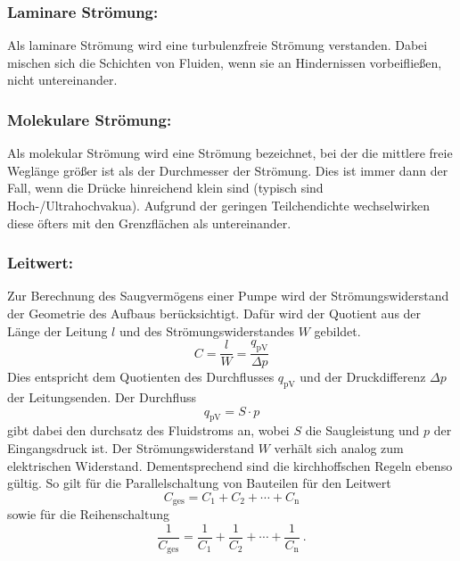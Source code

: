 \subsubsection{Laminare Strömung:}
Als laminare Strömung wird eine turbulenzfreie Strömung verstanden. Dabei mischen sich die Schichten von Fluiden, wenn sie an Hindernissen vorbeifließen, nicht untereinander.

\subsubsection{Molekulare Strömung:}
Als molekular Strömung wird eine Strömung bezeichnet, bei der die mittlere freie Weglänge größer ist als der Durchmesser der Strömung. Dies ist immer dann der Fall, wenn die Drücke hinreichend klein sind (typisch sind Hoch-/Ultrahochvakua). Aufgrund der geringen Teilchendichte wechselwirken diese öfters mit den Grenzflächen als untereinander.

\subsubsection{Leitwert:}
Zur Berechnung des Saugvermögens einer Pumpe wird der Strömungswiderstand der Geometrie des Aufbaus berücksichtigt. Dafür wird der Quotient aus der Länge der Leitung $l$ und des Strömungswiderstandes $W$ gebildet.
\begin{equation}
  C = \frac{l}{W} = \frac{q_\text{pV}}{\Delta p}
\end{equation}
Dies entspricht dem Quotienten des Durchflusses $q_\text{pV}$ und der Druckdifferenz $\Delta p$ der Leitungsenden. Der Durchfluss 
\begin{equation}
 q_\text{pV} = S \cdot p
  \label{eqn:durch}
\end{equation}
gibt dabei den durchsatz des Fluidstroms an, wobei $S$ die Saugleistung und $p$ der Eingangsdruck ist. Der Strömungswiderstand $W$ verhält sich analog zum elektrischen Widerstand. Dementsprechend sind die kirchhoffschen Regeln ebenso gültig. So gilt für die Parallelschaltung von Bauteilen für den Leitwert 
\begin{equation}
  C_\text{ges} = C_1 + C_2 + \cdots + C_\text{n} 
  \label{eqn:Leit}
\end{equation}
sowie für die Reihenschaltung 
\begin{equation}
  \frac{1}{C_\text{ges}} = \frac{1}{C_1} + \frac{1}{C_2} + \cdots + \frac{1}{C_\text{n}} \ . 
  \label{eqn:Leit}
\end{equation}

